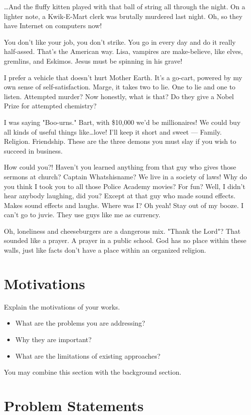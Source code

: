 \documentclass[12pt,oneside,openright,a4paper]{explo-english-project}
\begin{document}
…And the fluffy kitten played with that ball of string all through the night. On a lighter note, a Kwik-E-Mart clerk was brutally murdered last night. Oh, so they have Internet on computers now!

You don't like your job, you don't strike. You go in every day and do it really half-assed. That's the American way. Lisa, vampires are make-believe, like elves, gremlins, and Eskimos. Jesus must be spinning in his grave!

I prefer a vehicle that doesn't hurt Mother Earth. It's a go-cart, powered by my own sense of self-satisfaction. Marge, it takes two to lie. One to lie and one to listen. Attempted murder? Now honestly, what is that? Do they give a Nobel Prize for attempted chemistry?

I was saying "Boo-urns." Bart, with \$10,000 we'd be millionaires! We could buy all kinds of useful things like…love! I'll keep it short and sweet — Family. Religion. Friendship. These are the three demons you must slay if you wish to succeed in business.

How could you?! Haven't you learned anything from that guy who gives those sermons at church? Captain Whatshisname? We live in a society of laws! Why do you think I took you to all those Police Academy movies? For fun? Well, I didn't hear anybody laughing, did you? Except at that guy who made sound effects. Makes sound effects and laughs. Where was I? Oh yeah! Stay out of my booze. I can't go to juvie. They use guys like me as currency.

Oh, loneliness and cheeseburgers are a dangerous mix. "Thank the Lord"? That sounded like a prayer. A prayer in a public school. God has no place within these walls, just like facts don't have a place within an organized religion.


\section{Motivations}
Explain the motivations of your works.  
\begin{itemize}
\item   What are the problems you are addressing? 
\item  Why they are important?
\item  What are the limitations of existing approaches? 
\end{itemize}
You may combine this section with the background section.


\section{Problem Statements}
\end{document}
